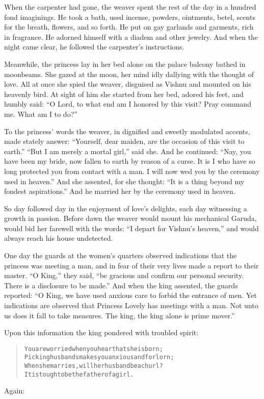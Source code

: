 \documentclass[article, twoside, 14pt]{memoir}
\renewenvironment{verbatim}{%
\begin{quote}%
\vskip -10pt%
\begin{alltt}\normalfont\large}{\end{alltt}%
\end{quote}%
\vskip -10pt
} %
\begin{document}
When the carpenter had gone, the weaver spent the rest of the day
in a hundred fond imaginings. He took a bath, used incense,
powders, ointments, betel, scents for the breath, flowers, and so
forth. He put on gay garlands and garments, rich in fragrance. He
adorned himself with a diadem and other jewelry. And when the night
came clear, he followed the carpenter's instructions.

Meanwhile, the princess lay in her bed alone on the palace balcony
bathed in moonbeams. She gazed at the moon, her mind idly dallying
with the thought of love. All at once she spied the weaver,
disguised as Vishnu and mounted on his heavenly bird. At sight of
him she started from her bed, adored his feet, and humbly said:
``O Lord, to what end am I honored by this visit? Pray command me. What am I to do?''

To the princess' words the weaver, in dignified and sweetly
modulated accents, made stately answer:
``Yourself, dear maiden, are the occasion of this visit to earth.''
``But I am merely a mortal girl,'' said she. And he continued:
``Nay, you have been my bride, now fallen to earth by reason of a curse. It is I who have so long protected you from contact with a man. I will now wed you by the ceremony used in heaven.''
And she assented, for she thought:
``It is a thing beyond my fondest aspirations.'' And he
married her by the ceremony used in heaven.

So day followed day in the enjoyment of love's delights, each day
witnessing a growth in passion. Before dawn the weaver would mount
his mechanical Garuda, would bid her farewell with the words:
``I depart for Vishnu's heaven,'' and would always reach his house
undetected.

One day the guards at the women's quarters observed indications
that the princess was meeting a man, and in fear of their very
lives made a report to their master. ``O King,'' they said,
``be gracious and confirm our personal security. There is a disclosure to be made.''
And when the king assented, the guards reported:
``O King, we have used anxious care to forbid the entrance of men. Yet indications are observed that Princess Lovely has meetings with a man. Not unto us does it fall to take measures. The king, the king alone is prime mover.''

Upon this information the king pondered with troubled spirit:

\begin{verbatim}
You are worried when you hear that she is born;
Picking husbands makes you anxious and forlorn;
When she marries, will her husband be a churl?
It is tough to be the father of a girl.
\end{verbatim}
Again:
\end{document}
